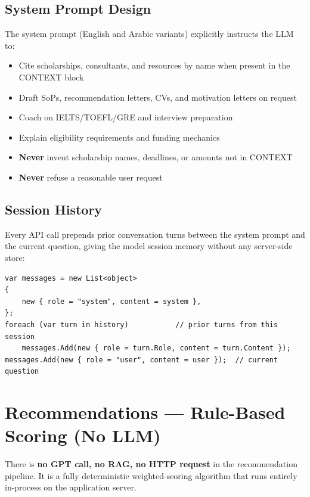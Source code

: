 \documentclass[11pt,a4paper]{article}
\begin{document}
\subsection{System Prompt Design}

The system prompt (English and Arabic variants) explicitly instructs the LLM to:

\begin{itemize}
  \item Cite scholarships, consultants, and resources by name when present in the CONTEXT block
  \item Draft SoPs, recommendation letters, CVs, and motivation letters on request
  \item Coach on IELTS/TOEFL/GRE and interview preparation
  \item Explain eligibility requirements and funding mechanics
  \item \textbf{Never} invent scholarship names, deadlines, or amounts not in CONTEXT
  \item \textbf{Never} refuse a reasonable user request
\end{itemize}

\subsection{Session History}

Every API call prepends prior conversation turns between the system prompt and the
current question, giving the model session memory without any server-side store:

\begin{lstlisting}[language={[Sharp]C},caption={ChatCompletionAsync --- session history injection}]
var messages = new List<object>
{
    new { role = "system", content = system },
};
foreach (var turn in history)           // prior turns from this session
    messages.Add(new { role = turn.Role, content = turn.Content });
messages.Add(new { role = "user", content = user });  // current question
\end{lstlisting}

\section{Recommendations --- Rule-Based Scoring (No LLM)}

\begin{warningbox}
There is \textbf{no GPT call, no RAG, no HTTP request} in the recommendation
pipeline. It is a fully deterministic weighted-scoring algorithm that runs
entirely in-process on the application server.
\end{warningbox}
\end{document}
